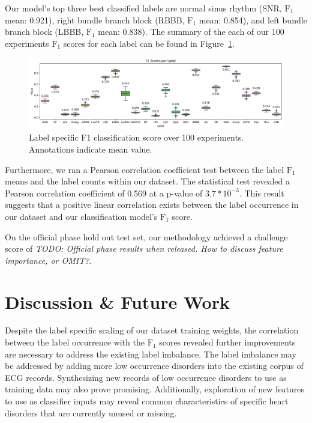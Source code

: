 \documentclass[twocolumn]{cinc}
\begin{document}
Our model's top three best classified labels are normal sinus rhythm (SNR, $\text{F}_1$ mean: 0.921), right bundle branch block (RBBB, $\text{F}_1$ mean: 0.854), and left bundle branch block (LBBB, $\text{F}_1$ mean: 0.838).
The summary of the each of our 100 experiments $\text{F}_1$ scores for each label can be found in Figure~\ref{fig:f1_score}.

\begin{figure}[ht]
  \centering
  \includegraphics[width=17.0cm]{fig/label_f1s.png}
  \caption{Label specific F1 classification score over 100 experiments. Annotations indicate mean value.}
  \label{fig:f1_score}
\end{figure}

Furthermore, we ran a Pearson correlation coefficient test between the label $\text{F}_1$ means and the label counts within our dataset.
The statistical test revealed a Pearson correlation coefficient of 0.569 at a p-value of $3.7 * 10^{-3}$.
This result suggests that a positive linear correlation exists between the label occurrence in our dataset and our classification model's $\text{F}_1$ score.

On the official phase hold out test set, our methodology achieved a challenge score of \emph{TODO: Official phase results when released. How to discuss feature importance, or OMIT?}.

\section{Discussion \& Future Work}

Despite the label specific scaling of our dataset training weights, the correlation between the label occurrence with the $\text{F}_1$ scores revealed further improvements are necessary to address the existing label imbalance.
The label imbalance may be addressed by adding more low occurrence disorders into the existing corpus of ECG records.
Synthesizing new records of low occurrence disorders to use as training data may also prove promising.
Additionally, exploration of new features to use as classifier inputs may reveal common characteristics of specific heart disorders that are currently unused or missing.
\end{document}
